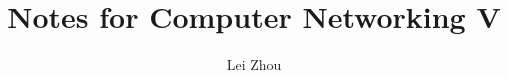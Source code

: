 \documentclass{article}
\begin{document}
\title{Notes for Computer Networking V}
\author{Lei Zhou}
\maketitle

%

%

%

%

%
\end{document}
